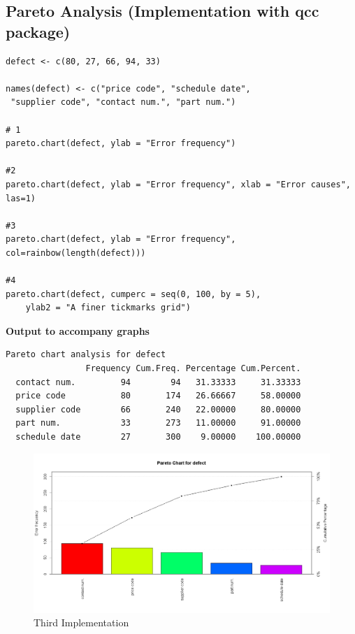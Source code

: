 \documentclass[]{article}
\begin{document}
\subsection{Pareto Analysis (Implementation with qcc package)}
\begin{framed}
\begin{verbatim}
defect <- c(80, 27, 66, 94, 33)

names(defect) <- c("price code", "schedule date", 
 "supplier code", "contact num.", "part num.")

# 1
pareto.chart(defect, ylab = "Error frequency")

#2
pareto.chart(defect, ylab = "Error frequency", xlab = "Error causes", las=1)

#3
pareto.chart(defect, ylab = "Error frequency", col=rainbow(length(defect)))

#4
pareto.chart(defect, cumperc = seq(0, 100, by = 5), 
    ylab2 = "A finer tickmarks grid")

\end{verbatim}
\end{framed}
\textbf{Output to accompany graphs}
\begin{verbatim}
Pareto chart analysis for defect
                Frequency Cum.Freq. Percentage Cum.Percent.
  contact num.         94        94   31.33333     31.33333
  price code           80       174   26.66667     58.00000
  supplier code        66       240   22.00000     80.00000
  part num.            33       273   11.00000     91.00000
  schedule date        27       300    9.00000    100.00000
\end{verbatim}
\newpage

\begin{figure}[h!]
\centering
\includegraphics[width=0.8\linewidth]{./Pareto3}
\caption{Third Implementation}
\label{fig:Pareto3}
\end{figure}
\end{document}
